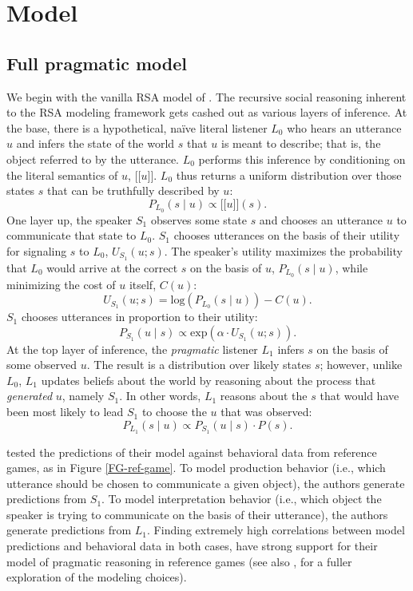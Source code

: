 \documentclass[10pt,a4paper]{article}
\newcommand{\sem}[1]{\mbox{$[\![$#1$]\!]$}}
\begin{document}
\section{Model}
\subsection{Full pragmatic model}

We begin with the vanilla RSA model of . The recursive social reasoning inherent to the RSA modeling framework gets cashed out as various layers of inference. At the base, there is a hypothetical, na\"ive literal listener $L_0$ who hears an utterance $u$ and infers the state of the world $s$ that $u$ is meant to describe; that is, the object referred to by the utterance. $L_0$ performs this inference by conditioning on the literal semantics of $u$, \sem{$u$}. $L_0$ thus returns a uniform distribution over those states $s$ that can be truthfully described by $u$:
$$P_{L_{0}}(s\mid u) \propto \sem{$u$}(s).$$
One layer up, the speaker $S_1$ observes some state $s$ and chooses an utterance $u$ to communicate that state to $L_0$. $S_1$ chooses utterances on the basis of their utility for signaling $s$ to $L_0$, $U_{S_1}(u;s)$. The speaker's utility maximizes the probability that $L_0$ would arrive at the correct $s$ on the basis of $u$, $P_{L_{0}}(s\mid u)$, while minimizing the cost of $u$ itself, $C(u)$:
$$U_{S_{1}}(u;s) = \textrm{log}(P_{L_{0}}(s\mid u)) - C(u).$$
$S_1$ chooses utterances in proportion to their utility:
$$P_{S_{1}} (u\mid s) \propto   \textrm{exp}(\alpha \cdot U_{S_{1}} (u;s)).$$
At the top layer of inference, the \emph{pragmatic} listener $L_1$ infers $s$ on the basis of some observed $u$. The result is a distribution over likely states $s$; however, unlike $L_0$, $L_1$ updates beliefs about the world by reasoning about the process that \emph{generated} $u$, namely $S_1$. In other words, $L_1$ reasons about the $s$ that would have been most likely to lead $S_1$ to choose the $u$ that was observed:
$$P_{L_{1}}(s\mid u) \propto P_{S_{1}}(u\mid s) \cdot P(s).$$

 tested the predictions of their model against behavioral data from reference games, as in Figure \ref{FG-ref-game}. To model production behavior (i.e., which utterance should be chosen to communicate a given object), the authors generate predictions from $S_1$. To model interpretation behavior (i.e., which object the speaker is trying to communicate on the basis of their utterance), the authors generate predictions from $L_1$. Finding extremely high correlations between model predictions and behavioral data in both cases, \citeauthor{frankgoodman2012} have strong support for their model of pragmatic reasoning in reference games (see also , for a fuller exploration of the modeling choices).
\end{document}
